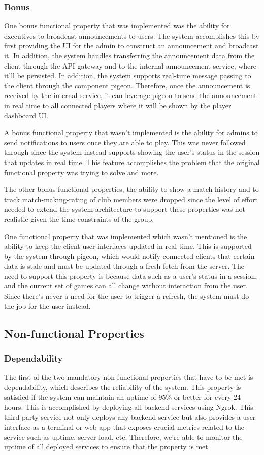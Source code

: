 \documentclass{article}
\begin{document}
\subsubsection{Bonus}
One bonus functional property that was implemented was the ability for executives to broadcast announcements to users. The system accomplishes this by first providing the UI for the admin to construct an announcement and broadcast it. In addition, the system handles transferring the announcement data from the client through the API gateway and to the internal announcement service, where it'll be persisted. In addition, the system supports real-time message passing to the client through the component pigeon. Therefore, once the announcement is received by the internal service, it can leverage pigeon to send the announcement in real time to all connected players where it will be shown by the player dashboard UI.

A bonus functional property that wasn't implemented is the ability for admins to send notifications to users once they are able to play. This was never followed through since the system instead supports showing the user's status in the session that updates in real time. This feature accomplishes the problem that the original functional property was trying to solve and more.

The other bonus functional properties, the ability to show a match history and to track match-making-rating of club members were dropped since the level of effort needed to extend the system architecture to support these properties was not realistic given the time constraints of the group.

One functional property that was implemented which wasn't mentioned is the ability to keep the client user interfaces updated in real time. This is supported by the system through pigeon, which would notify connected clients that certain data is stale and must be updated through a fresh fetch from the server. The need to support this property is because data such as a user's status in a session, and the current set of games can all change without interaction from the user. Since there's never a need for the user to trigger a refresh, the system must do the job for the user instead.

\subsection{Non-functional Properties}
\subsubsection{Dependability}
The first of the two mandatory non-functional properties that have to be met is dependability, which describes the reliability of the system. This property is satisfied if the system can maintain an uptime of 95\% or better for every 24 hours. This is accomplished by deploying all backend services using Ngrok. This third-party service not only deploys any backend service but also provides a user interface as a terminal or web app that exposes crucial metrics related to the service such as uptime, server load, etc. Therefore, we're able to monitor the uptime of all deployed services to ensure that the property is met.
\end{document}
